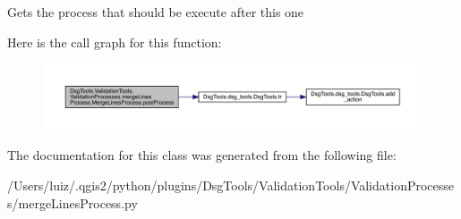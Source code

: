 \begin{DoxyVerb}Gets the process that should be execute after this one
\end{DoxyVerb}
 Here is the call graph for this function\+:
\nopagebreak
\begin{figure}[H]
\begin{center}
\leavevmode
\includegraphics[width=350pt]{class_dsg_tools_1_1_validation_tools_1_1_validation_processes_1_1merge_lines_process_1_1_merge_lines_process_aff17cedf1d08ff12a85531d40c0dd43a_cgraph}
\end{center}
\end{figure}


The documentation for this class was generated from the following file\+:\begin{DoxyCompactItemize}
\item 
/\+Users/luiz/.\+qgis2/python/plugins/\+Dsg\+Tools/\+Validation\+Tools/\+Validation\+Processes/merge\+Lines\+Process.\+py\end{DoxyCompactItemize}
